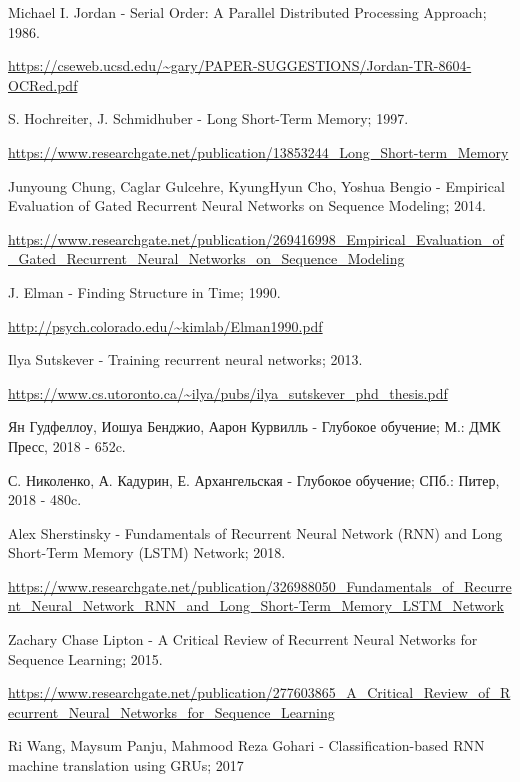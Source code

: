 	
	\begin{thebibliography}{}
		  Michael I. Jordan	-	Serial Order: A Parallel Distributed Processing Approach; 1986. 
		
		\url{https://cseweb.ucsd.edu/~gary/PAPER-SUGGESTIONS/Jordan-TR-8604-OCRed.pdf}
		
		  S. Hochreiter, J. Schmidhuber	-	Long Short-Term Memory; 1997.
		
		\url{https://www.researchgate.net/publication/13853244_Long_Short-term_Memory}
		
		  Junyoung Chung, Caglar Gulcehre, KyungHyun Cho, Yoshua Bengio	-	Empirical Evaluation of Gated Recurrent Neural Networks on Sequence Modeling; 2014.
		
		\url{https://www.researchgate.net/publication/269416998_Empirical_Evaluation_of_Gated_Recurrent_Neural_Networks_on_Sequence_Modeling}
		
		 J. Elman	-	Finding Structure in Time; 1990.
		
		\url{http://psych.colorado.edu/~kimlab/Elman1990.pdf}
		
		 Ilya Sutskever	-	Training recurrent neural networks; 2013.
		
		\url{https://www.cs.utoronto.ca/~ilya/pubs/ilya_sutskever_phd_thesis.pdf}
		
		 Ян Гудфеллоу, Иошуа Бенджио, Аарон Курвилль	-	Глубокое обучение; М.: ДМК Пресс, 2018 - 652c. 
		
		 С. Николенко, А. Кадурин, Е. Архангельская	-	Глубокое обучение;  СПб.: Питер, 2018 - 480c.
		
		 Alex Sherstinsky	-	Fundamentals of Recurrent Neural Network (RNN) and Long Short-Term Memory (LSTM) Network; 2018.
		
		\url{https://www.researchgate.net/publication/326988050_Fundamentals_of_Recurrent_Neural_Network_RNN_and_Long_Short-Term_Memory_LSTM_Network}
		
		 Zachary Chase Lipton	-	A Critical Review of Recurrent Neural Networks for Sequence Learning; 2015.
		
		\url{https://www.researchgate.net/publication/277603865_A_Critical_Review_of_Recurrent_Neural_Networks_for_Sequence_Learning}
		
		 Ri Wang, Maysum Panju, Mahmood Reza Gohari -   Classification-based RNN machine translation using GRUs; 2017
		

\end{thebibliography}
